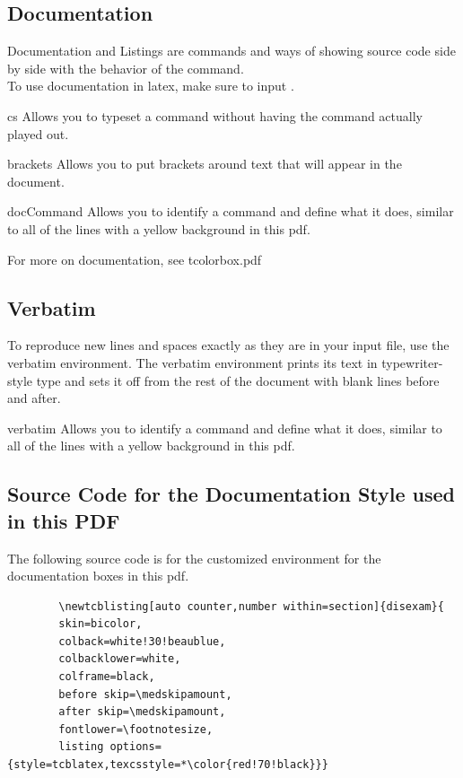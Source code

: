 	\subsection{Documentation}
	Documentation and Listings are commands and ways of showing source code side by side with the behavior of the command.\\
	To use documentation in latex, make sure to input .
		\begin{docCommand}{cs}{}
			Allows you to typeset a command without having the command actually played out.
		\end{docCommand}
		\begin{disexam}
		\end{disexam}
		\begin{docCommand}{brackets}{}
			Allows you to put brackets around text that will appear in the document.
		\end{docCommand}
		\begin{disexam}
		\end{disexam}
		\begin{docEnvironment}{docCommand}{}
			Allows you to identify a command and define what it does, similar to all of the lines with a yellow background in this pdf.
		\end{docEnvironment}
		For more on documentation, see tcolorbox.pdf
	\subsection{Verbatim}
		To reproduce new lines and spaces exactly as they are in your input file, use the verbatim environment. The verbatim environment prints its text in typewriter-style type and sets it off from the rest of the document with blank lines before and after.
		\begin{docEnvironment}{verbatim}{}
			Allows you to identify a command and define what it does, similar to all of the lines with a yellow background in this pdf.
		\end{docEnvironment}
\newpage
	\subsection{Source Code for the Documentation Style used in this PDF}
	The following source code is for the customized environment for the documentation boxes in this pdf. 
		\begin{verbatim}
		\newtcblisting[auto counter,number within=section]{disexam}{
		skin=bicolor,
		colback=white!30!beaublue,
		colbacklower=white,
		colframe=black,
		before skip=\medskipamount,
		after skip=\medskipamount,
		fontlower=\footnotesize,
		listing options={style=tcblatex,texcsstyle=*\color{red!70!black}}}
		\end{verbatim}
\newpage
